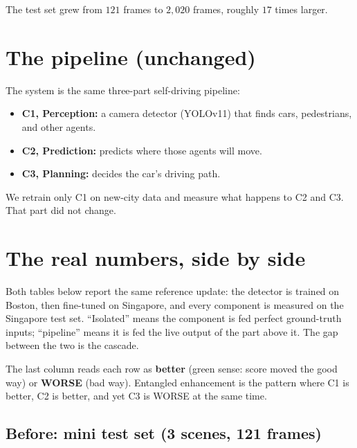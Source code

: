 \documentclass[11pt,a4paper]{article}
\begin{document}
\noindent
The test set grew from $121$ frames to $2{,}020$ frames, roughly $17$ times
larger.

\section{The pipeline (unchanged)}

The system is the same three-part self-driving pipeline:

\begin{itemize}[noitemsep]
    \item \textbf{C1, Perception:} a camera detector (YOLOv11) that finds cars,
          pedestrians, and other agents.
    \item \textbf{C2, Prediction:} predicts where those agents will move.
    \item \textbf{C3, Planning:} decides the car's driving path.
\end{itemize}

We retrain only C1 on new-city data and measure what happens to C2 and C3. That
part did not change.

\section{The real numbers, side by side}

Both tables below report the same reference update: the detector is trained on
Boston, then fine-tuned on Singapore, and every component is measured on the
Singapore test set. ``Isolated'' means the component is fed perfect
ground-truth inputs; ``pipeline'' means it is fed the live output of the part
above it. The gap between the two is the cascade.

The last column reads each row as \textbf{better} (green sense: score moved the
good way) or \textbf{WORSE} (bad way). Entangled enhancement is the pattern where
C1 is better, C2 is better, and yet C3 is WORSE at the same time.

\subsection*{Before: mini test set (3 scenes, 121 frames)}
\end{document}
